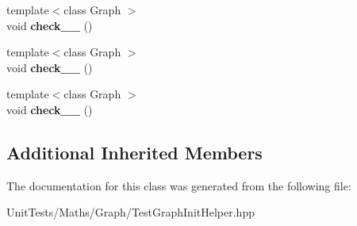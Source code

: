 \begin{DoxyCompactItemize}
\mbox{\label{classsequoia_1_1unit__testing_1_1directed__init__checker_a0afaef194b0e247752cb44178d72ba39}} 
{\footnotesize template$<$class Graph $>$ }\\void {\bfseries check\+\_\+\_} ()
\item 
\mbox{\label{classsequoia_1_1unit__testing_1_1directed__init__checker_a4e1dce5e4576b689cc453e8c6a3c1d96}} 
{\footnotesize template$<$class Graph $>$ }\\void {\bfseries check\+\_\+\_} ()
\item 
\mbox{\label{classsequoia_1_1unit__testing_1_1directed__init__checker_a9fae85e3f059e7bf97e49808e4306ce0}} 
{\footnotesize template$<$class Graph $>$ }\\void {\bfseries check\+\_\+\_} ()
\end{DoxyCompactItemize}
\subsection*{Additional Inherited Members}


The documentation for this class was generated from the following file\+:\begin{DoxyCompactItemize}
\item 
Unit\+Tests/\+Maths/\+Graph/Test\+Graph\+Init\+Helper.\+hpp\end{DoxyCompactItemize}
